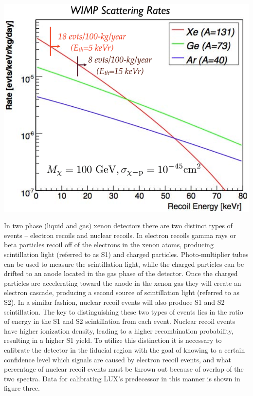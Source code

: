 \documentclass[a4paper,12pt]{article}
\begin{document}
\begin{center}
\includegraphics[scale=1]{CrossSections.png}
\end{center}

In two phase (liquid and gas) xenon detectors there are two distinct types of events -- electron recoils and nuclear recoils.  In electron recoils gamma rays or beta particles recoil off of the electrons in the xenon atoms, producing scintillation light (referred to as S1) and charged particles.  Photo-multiplier tubes can be used to measure the scintillation light, while the charged particles can be drifted to an anode located in the gas phase of the detector.  Once the charged particles are accelerating toward the anode in the xenon gas they will create an electron cascade, producing a second source of scintillation light (referred to as S2).  In a similar fashion, nuclear recoil events will also produce S1 and S2 scintillation.  The key to distinguishing these two types of events lies in the ratio of energy in the S1 and S2 scintillation from each event.  Nuclear recoil events have higher ionization density, leading to a higher recombination probability, resulting in a higher S1 yield. To utilize this distinction it is necessary to calibrate the detector in the fiducial region with the goal of knowing to a certain confidence level which signals are caused by electron recoil events, and what percentage of nuclear recoil events must be thrown out because of overlap of the two spectra.  Data for calibrating LUX's predecessor in this manner is shown in figure three.
\end{document}
